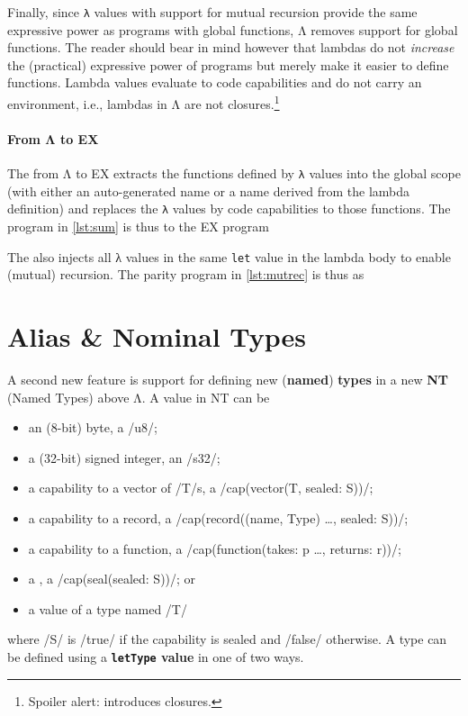 \documentclass[main.tex]{subfiles}
\begin{document}
Finally, since \texttt{λ} values with support for mutual recursion provide the same expressive power as programs with global functions, Λ removes support for global functions. The reader should bear in mind however that lambdas do not \emph{increase} the (practical) expressive power of programs but merely make it easier to define functions. Lambda values evaluate to code capabilities and do not carry an environment, i.e., lambdas in Λ are not closures.\footnote{Spoiler alert:  introduces closures.}

\paragraph{From Λ to EX} The  from Λ to EX extracts the functions defined by \texttt{λ} values into the global scope (with either an auto-generated name or a name derived from the lambda definition) and replaces the \texttt{λ} values by code capabilities to those functions. The program in \cref{lst:sum} is thus \lowered{} to the EX program

The  also injects all λ values in the same \texttt{let} value in the lambda body to enable (mutual) recursion. The parity program in \cref{lst:mutrec} is thus \lowered{} as

\section{Alias \& Nominal Types} \label{sct:named-ty}
A second new feature is support for defining new (\textbf{named}) \textbf{types} in a new  \textbf{NT} (Named Types) above Λ. A value in NT can be
\begin{itemize}[nosep]
	\item an (8-bit) byte, a \iil/u8/;
	\item a (32-bit) signed integer, an \iil/s32/;
	\item a capability to a vector of \iil/T/s, a \iil/cap(vector(T, sealed: S))/;
	\item a capability to a record, a \iil/cap(record((name, Type) …, sealed: S))/;
	\item a capability to a function, a \iil/cap(function(takes: p …, returns: r))/;
	\item a , a \iil/cap(seal(sealed: S))/; or
	\item a value of a type named \iil/T/
\end{itemize}
where \iil/S/ is \iil/true/ if the capability is sealed and \iil/false/ otherwise. A type can be defined using a \textbf{\texttt{letType} value} in one of two ways.
\end{document}
